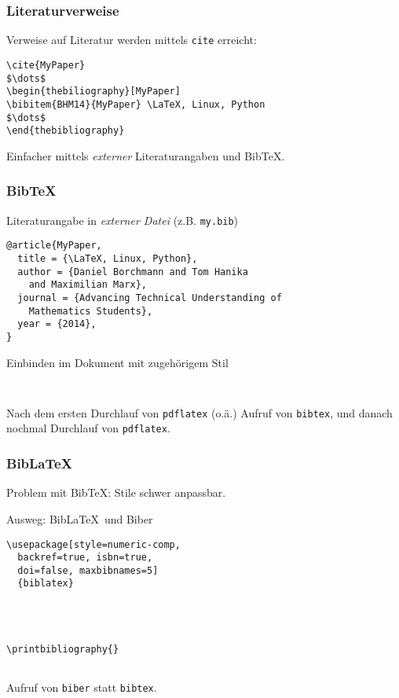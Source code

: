 \begin{frame}[fragile]
  \frametitle{Literaturverweise}

  \onslide<+->

  Verweise auf Literatur werden mittels \lstinline{cite} erreicht:

\begin{lstlisting}
\cite{MyPaper}
$\dots$
\begin{thebiliography}[MyPaper]
\bibitem{BHM14}{MyPaper} \LaTeX, Linux, Python
$\dots$
\end{thebibliography}
\end{lstlisting}

  \onslide<+->

  Einfacher mittels \emph{externer} Literaturangaben und Bib\TeX.

\end{frame}

\begin{frame}
  \frametitle{Bib\TeX}

  \onslide<+->

  Literaturangabe in \emph{externer Datei} (z.B. \texttt{my.bib})

\begin{lstlisting}
@article{MyPaper,
  title = {\LaTeX, Linux, Python},
  author = {Daniel Borchmann and Tom Hanika
    and Maximilian Marx},
  journal = {Advancing Technical Understanding of
    Mathematics Students},
  year = {2014},
}
\end{lstlisting}

  \onslide<+->

  Einbinden im Dokument mit zugehörigem Stil
\begin{lstlisting}


\end{lstlisting}

  \onslide<+->

  Nach dem ersten Durchlauf von \texttt{pdflatex} (o.ä.) Aufruf von \texttt{bibtex}, und
  danach nochmal Durchlauf von \texttt{pdflatex}.

\end{frame}

\begin{frame}[fragile]
  \frametitle{Bib\LaTeX}

  \onslide<+->

  Problem mit Bib\TeX: Stile schwer anpassbar.

  \onslide<+->

  Ausweg: Bib\LaTeX\ und Biber

  \onslide<+->

\begin{lstlisting}
\usepackage[style=numeric-comp,
  backref=true, isbn=true,
  doi=false, maxbibnames=5]
  {biblatex}




\printbibliography{}


\end{lstlisting}

  \onslide<+->

  Aufruf von \texttt{biber} statt \texttt{bibtex}.

\end{frame}

